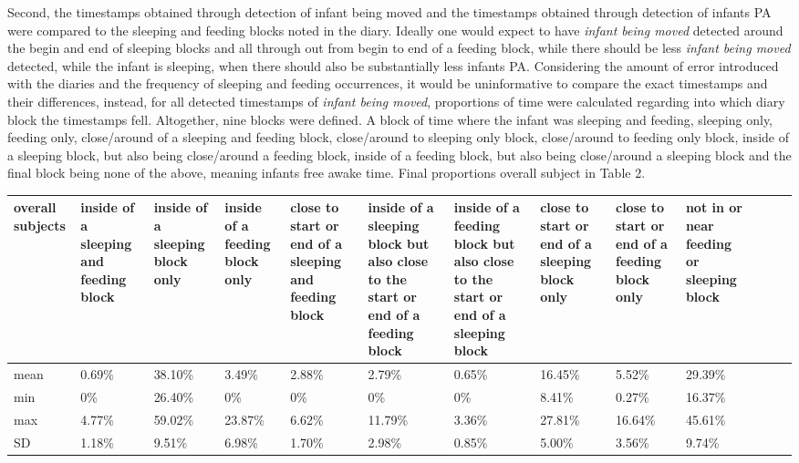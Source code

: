 \documentclass{article}
\begin{document}
{Second, the timestamps obtained through detection of infant being moved and the timestamps obtained through detection of infants PA were compared to the sleeping and feeding blocks noted in the diary. Ideally one would expect to have \textit{infant being moved} detected around the begin and end of sleeping blocks and all through out from begin to end of a feeding block, while there should be less \textit{infant being moved} detected, while the infant is sleeping, when there should also be substantially less infants PA. Considering the amount of error introduced with the diaries and the frequency of sleeping and feeding occurrences, it would be uninformative to compare the exact timestamps and their differences, instead, for all detected timestamps of \textit{infant being moved}, proportions of time were calculated regarding into which diary block the timestamps fell. Altogether, nine blocks were defined. A block of time where the infant was sleeping and feeding, sleeping only, feeding only, close/around of a sleeping and feeding block, close/around to sleeping only block, close/around to feeding only block, inside of a sleeping block, but also being close/around a feeding block, inside of a feeding block, but also being close/around a sleeping block and the final block being none of the above, meaning infants free awake time. Final proportions overall subject in Table 2.
\begin{table}[h]\tiny
\centering
\begin{tabular}{|p{0.5cm}|p{1cm}|p{1cm}|p{1cm}|p{1.5cm}|p{1.5cm}|p{1.5cm}|p{1.2cm}|p{1cm}|p{1cm}|p{1cm}|p{1cm}|p{1cm}|}
\hline
overall subjects & inside of a sleeping and feeding block & inside of a sleeping block only & inside of a feeding block only & close to start or end of a sleeping and feeding block & inside of a sleeping block but also close to the start or end of a feeding block & inside of a feeding block but also close to the start or end of a sleeping block & close to start or end of a sleeping block only & close to start or end of a feeding block only & not in or near feeding or sleeping block \\ \hline
mean & 0.69\%  & 38.10\%  & 3.49\%  & 2.88\%  & 2.79\%  & 0.65\%  & 16.45\%  & 5.52\%  & 29.39\% \\ \hline
min & 0\% & 26.40\%  & 0\% & 0\% & 0\% & 0\% & 8.41\% & 0.27\%  & 16.37\% \\ \hline
max & 4.77\%  & 59.02\%  & 23.87\% & 6.62\%  & 11.79\% & 3.36\%  & 27.81\%  & 16.64\%  & 45.61\% \\ \hline
SD & 1.18\% & 9.51\% & 6.98\% & 1.70\% & 2.98\%  & 0.85\%  & 5.00\% & 3.56\%  & 9.74\% \\ \hline

\end{tabular}
\end{table}}
\end{document}

